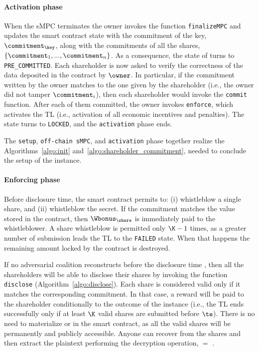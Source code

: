 \medskip

\paragraph*{Activation phase}
When the sMPC terminates the owner invokes the function \texttt{finalizeMPC} and updates the smart contract state with the commitment of the key, $ \commitment _\key $, along with the commitments of all the shares, $\{ \commitment _1 , ... , \commitment _n \}$. 
As a consequence, the state of \shortname turns to \texttt{PRE\_COMMITTED}. 
Each shareholder is now asked to verify the correctness of the data deposited in the contract by $\owner$. 
In particular, if the commitment written by the owner matches to the one given by the shareholder (i.e., the owner did not tamper $\commitment_i$), then each shareholder would invoke the \texttt{commit} function. 
After each of them committed, the owner invokes \texttt{enforce}, which activates the TL (i.e., activation of all economic incentives and penalties). 
The state turns to \texttt{LOCKED}, and the \texttt{activation} phase ends.

The \texttt{setup}, \texttt{off-chain sMPC}, and \texttt{activation} phase together realize the Algorithms~\ref{algo:init} and~\ref{algo:shareholder_commitment}, needed to conclude the setup of the \shortname instance. 

\medskip

\paragraph*{Enforcing phase}\label{sect:impl_enf_brief}

Before disclosure time, the smart contract permits to: (i) whistleblow a single share, and (ii) whistleblow the secret.
If the commitment matches the value stored in the contract, then $\Wbonus_{\share}$ is immediately paid to the whistleblower.
A share whistleblow is permitted only $\K - 1 $ times, as a greater number of submission leads the TL to the \texttt{FAILED} state.
When that happens the remaining amount locked by the contract is destroyed.

If no adversarial coalition reconstructs \key before the disclosure time \td, then all the shareholders will be able to disclose their shares by invoking the function \texttt{disclose} (Algorithm~\ref{algo:disclose}).
Each share is considered valid only if it matches the corresponding commitment.
In that case, a reward will be paid to the shareholder conditionally to the outcome of the instance (i.e., the TL ends successfully only if at least $\K$ valid shares are submitted before $\te$).
There is no need to materialize \key or \secret in the smart contract, as all the valid shares will be permanently and publicly accessible. Anyone can recover \key from the shares and then extract the plaintext performing the decryption operation, \secret $=$ \unwrap.


